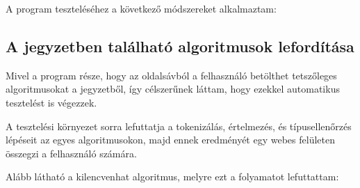 A program teszteléséhez a következő módszereket alkalmaztam:

\subsection{A jegyzetben található algoritmusok lefordítása}

Mivel a program része, hogy az oldalsávból a felhasználó betölthet tetszőleges algoritmusokat a jegyzetből, így célszerűnek láttam, hogy ezekkel automatikus tesztelést is végezzek.

A tesztelési környezet sorra lefuttatja a tokenizálás, értelmezés, és típusellenőrzés lépéseit az egyes algoritmusokon, majd ennek eredményét egy webes felületen összegzi a felhasználó számára.

Alább látható a kilencvenhat algoritmus, melyre ezt a folyamatot lefuttattam:

